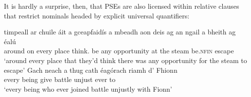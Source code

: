 \documentclass[output=paper,colorlinks,citecolor=brown]{langscibook}
\begin{document}

It is hardly a surprise, then, that PSEs are also licensed within relative clauses that restrict nominals headed by explicit universal quantifiers:

\ea
\ea
\gll timpeall ar chuile áit a gceapfaidís a mbeadh aon deis ag an ngail {a bheith} ag éalú \\
     around on every place {\go} {think\cond.\their} {\go} {be\cond} any opportunity at the steam {be.\textsc{nfin}} {\prog} {escape\vn} \\
\glt `around every place that they'd think there was any opportunity for the steam to escape'
\ex
\gll Gach neach a thug cath éagórach riamh d' Fhionn \\
     every being {\go} {give\past} battle unjust ever to {} \\
\glt `every being who ever joined battle unjustly with Fionn'
\z
\z




\end{document}
